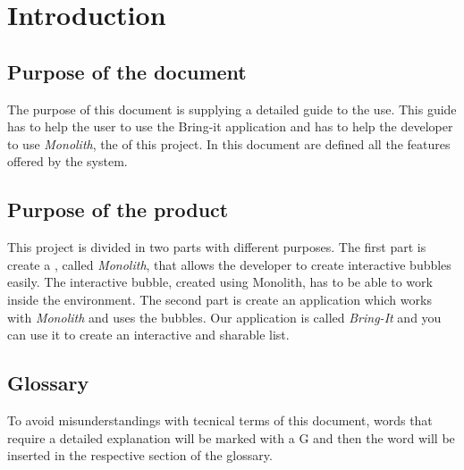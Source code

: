\section{Introduction}

\subsection{Purpose of the document}
The purpose of this document is supplying a detailed guide to the use. This guide has to help the user to use the Bring-it application and has to help the developer to use \textit{Monolith}, the  of this project. In this document are defined all the features offered by the system.

\subsection{Purpose of the product}
This project is divided in two parts with different purposes. The first part is create a , called \textit{Monolith}, that allows the developer to create interactive bubbles easily. The interactive bubble, created using Monolith, has to be able to
work inside the  environment.
The second part is create an application which works with \textit{Monolith} and uses the bubbles. Our application is called \textit{Bring-It} and you can use it to create an interactive and sharable list.

\subsection{Glossary}
To avoid misunderstandings with tecnical terms of this document, words that require a detailed explanation will be marked with a G and then the word will be inserted in the respective section of the glossary.
